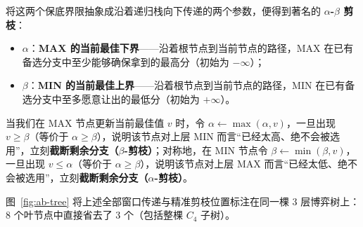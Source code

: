 将这两个保底界限抽象成沿着递归栈向下传递的两个参数，便得到著名的 \textbf{$\alpha$-$\beta$ 剪枝}：
\begin{itemize}
  \item $\alpha$：\textbf{\textsf{MAX} 的当前最佳下界}——沿着根节点到当前节点的路径，\textsf{MAX} 在已有备选分支中至少能够确保拿到的最高分（初始为 $-\infty$）；
  \item $\beta$：\textbf{\textsf{MIN} 的当前最佳上界}——沿着根节点到当前节点的路径，\textsf{MIN} 在已有备选分支中至多愿意让出的最低分（初始为 $+\infty$）。
\end{itemize}
当我们在 \textsf{MAX} 节点更新当前最佳值 $v$ 时，令 $\alpha \leftarrow \max(\alpha, v)$，一旦出现 $v \ge \beta$（等价于 $\alpha \ge \beta$），说明该节点对上层 \textsf{MIN} 而言“已经太高、绝不会被选用”，立刻\textbf{截断剩余分支（$\beta$-剪枝）}；对称地，在 \textsf{MIN} 节点令 $\beta \leftarrow \min(\beta, v)$，一旦出现 $v \le \alpha$（等价于 $\alpha \ge \beta$），说明该节点对上层 \textsf{MAX} 而言“已经太低、绝不会被选用”，立刻\textbf{截断剩余分支（$\alpha$-剪枝）}。

图~\ref{fig:ab-tree} 将上述全部窗口传递与精准剪枝位置标注在同一棵 3 层博弈树上：8 个叶节点中直接省去了 3 个（包括整棵 $C_4$ 子树）。

